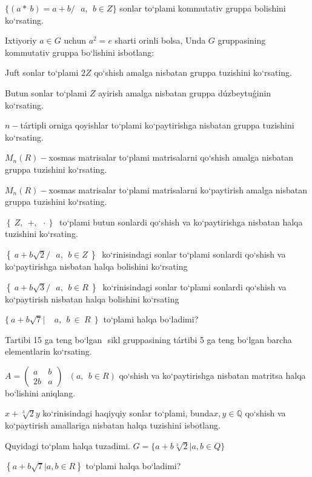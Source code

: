 \(\{(a*\ b) = a + b/\ \ \ a,\ \ b \in Z\}\) sonlar to`plami kommutativ gruppa bolishini ko`rsating.

Ixtiyoriy \(a \in G\) uchun \(a^{2} = e\) sharti orinli bolsa, Unda \(G\) gruppasining kommutativ gruppa bo`lishini isbotlang:

Juft sonlar to`plami \(2Z\) qo`shish amalga nisbatan gruppa tuzishini ko`rsating.

Butun sonlar to`plami \(Z\) ayirish amalga nisbatan gruppa dúzbeytuǵinin ko`rsating.

\(n -\)tártipli orniga qoyishlar to`plami ko`paytirishga nisbatan gruppa tuzishini ko`rsating.

\(M_{n}(R) -\)xosmas matrisalar to`plami matrisalarni qo`shish amalga nisbatan gruppa tuzishini ko`rsating.

\(M_{n}(R) -\)xosmas matrisalar to`plami matrisalarni ko`paytirish amalga nisbatan gruppa tuzishini ko`rsating.

\(\left\{ \left. \ Z,\ \  + ,\ \  \cdot \right\} \right.\ \) to`plami butun sonlardi qo`shish va ko`paytirishga nisbatan halqa tuzishini ko`rsating.

\(\left\{ \left. \ a + b\sqrt{2}/\ \ \ a,\ \ b \in Z\  \right\} \right.\ \) ko`rinisindagi sonlar to`plami sonlardi qo`shish va ko`paytirishga nisbatan halqa bolishini ko`rsating

\(\left\{ \left. \ a + b\sqrt{3}/\ \ \ a,\ \ b \in R\  \right\} \right.\ \) ko`rinisindagi sonlar to`plami sonlardi qo`shish va ko`paytirish nisbatan halqa bolishini ko`rsating

\(\{\ a + b\sqrt{7}\left| \ \ \ \ \ a,\ \ b\  \in \ R\ \ \} \right.\ \) to`plami halqa bo`ladimi?

Tartibi 15 ga teng bo`lgan \(< a >\) sikl gruppasining tártibi 5 ga teng bo`lgan barcha elementlarin ko`rsating.

\(A = \begin{pmatrix}
a & b \\
2b & a
\end{pmatrix}\ \ \ (a,\ \ b \in R)\) qo`shish va ko`paytirishga nisbatan matritsa halqa bo`lishini aniqlang.

\(x + \sqrt[3]{2}y\) ko`rinisindagi haqiyqiy sonlar to`plami, bunda\(x,y\mathbb{\in Q}\) qo`shish va ko`paytirish amallariga nisbatan halqa tuzishini isbotlang.

Quyidagi to`plam halqa tuzadimi. \(G = \{ a + b\sqrt[3]{2}|a,b \in Q\}\)

\(\left\{ a + b\sqrt{7}|a,b \in R \right\}\) to`plami halqa bo`ladimi?